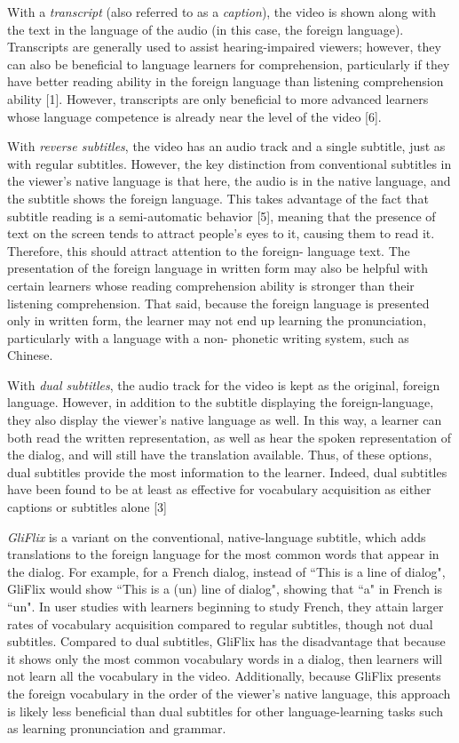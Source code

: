 \documentclass{sigchi}
\begin{document}
With a \emph{transcript} (also referred to as a \emph{caption}), the video is shown along with the text in the
language of the audio (in this case, the foreign language). Transcripts are generally used to
assist hearing-impaired viewers; however, they can also be beneficial to language learners for
comprehension, particularly if they have better reading ability in the foreign language than
listening comprehension ability [1]. However, transcripts are only beneficial to more advanced
learners whose language competence is already near the level of the video [6].

With \emph{reverse subtitles}, the video has an audio track and a single subtitle, just as with regular
subtitles. However, the key distinction from conventional subtitles in the viewer's native language is that here, the audio is in the native language, and
the subtitle shows the foreign language. This takes advantage of the fact that subtitle reading is
a semi-automatic behavior [5], meaning that the presence of text on the screen tends to attract
people's eyes to it, causing them to read it. Therefore, this should attract attention to the foreign-
language text. The presentation of the foreign language in written form may also be helpful with
certain learners whose reading comprehension ability is stronger than their listening
comprehension. That said, because the foreign language is presented only in written form, the
learner may not end up learning the pronunciation, particularly with a language with a non-
phonetic writing system, such as Chinese.

With \emph{dual subtitles}, the audio track for the video is kept as the original, foreign language.
However, in addition to the subtitle displaying the foreign-language, they also display the
viewer's native language as well. In this way, a learner can both read the written representation,
as well as hear the spoken representation of the dialog, and will still have the translation
available. Thus, of these options, dual subtitles provide the most information to the learner.
Indeed, dual subtitles have been found to be at least as effective for vocabulary acquisition as
either captions or subtitles alone [3]

\emph{GliFlix} is a variant on the conventional, native-language subtitle, which adds translations to the foreign language for the most common words that
appear in the dialog. For example, for a French dialog, instead of ``This is a line of dialog", GliFlix would show ``This is a (un) line of dialog", showing that ``a" in French is ``un". In user studies with learners beginning to study French, they attain larger rates of vocabulary acquisition compared to regular
subtitles, though not dual subtitles. Compared to dual subtitles, GliFlix has the disadvantage that because it shows only the most common vocabulary words in a dialog, then learners will not learn all the vocabulary in the video. Additionally, because GliFlix presents the foreign vocabulary in the order of the viewer's native language, this approach is likely less beneficial than dual subtitles for
other language-learning tasks such as learning pronunciation and grammar.
\end{document}

